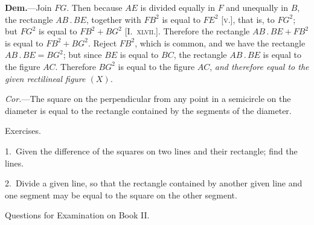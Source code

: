 \documentclass[oneside]{book}
\newcommand\exhead[1]{
\Needspace*{5\baselineskip}\begin{center}
\textsf{#1}
\end{center}
}
\begin{document}
\textbf{Dem.}---Join $FG$. Then because $AE$ is divided
equally in $F$ and unequally in $B$, the rectangle $AB\,.\,BE$,
together with $FB^{2}$ is equal to $FE^{2}$ [\textsc{v.}], that is, to $FG^{2}$;
but $FG^{2}$ is equal to $FB^{2} + BG^{2}$ [I.~\textsc{xlvii.}]. Therefore
the rectangle $AB\,.\,BE + FB^{2}$ is equal to $FB^{2} + BG^{2}$.
Reject $FB^{2}$, which is common, and we have the rectangle
$AB\,.\,BE = BG^{2}$; but since $BE$ is equal to $BC$,
the rectangle $AB\,.\,BE$ is equal to the figure $AC$.
Therefore $BG^{2}$ is equal to the figure $AC$, \textit{and therefore
equal to the given rectilineal figure $(X)$.}

\textit{Cor.}---The square on the perpendicular from any
point in a semicircle on the diameter is equal to the
rectangle contained by the segments of the diameter.


\exhead{Exercises.}

\begin{footnotesize}
1.~Given the difference of the squares on two lines and their
rectangle; find the lines.

2.~Divide a given line, so that the rectangle contained by
another given line and one segment may be equal to the square
on the other segment.
\par\end{footnotesize}

\exhead{Questions for Examination on Book II\@.}
\end{document}
